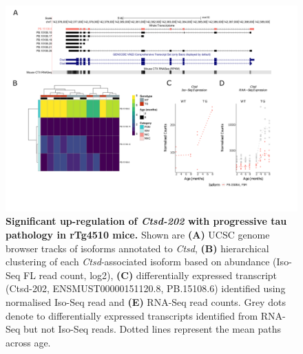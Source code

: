 \begin{landscape}
	\begin{figure}[!htp]
		\centering
		\includegraphics[page=1,trim={1.5cm 2.5cm 2cm 2cm}, scale = 0.85]{Figures/Ch5_DiffPlots_Landscape.pdf}
		\captionsetup{width=1.5\textwidth}
		\caption[Differential \textit{Ctsd} transcript expression]%
		{\textbf{Significant up-regulation of \textit{Ctsd-202} with progressive tau pathology in rTg4510 mice.} Shown are \textbf{(A)} UCSC genome browser tracks of isoforms annotated to \textit{Ctsd}, \textbf{(B)} hierarchical clustering of each \textit{Ctsd}-associated isoform based on abundance (Iso-Seq FL read count, log2), \textbf{(C)} differentially expressed transcript (Ctsd-202, ENSMUST00000151120.8, PB.15108.6) identified using normalised Iso-Seq read and \textbf{(E)} RNA-Seq read counts. Grey dots denote to differentially expressed transcripts identified from RNA-Seq but not Iso-Seq reads. Dotted lines represent the mean paths across age.}   
		\label{fig:Ctsd}
	\end{figure}	
\end{landscape}

